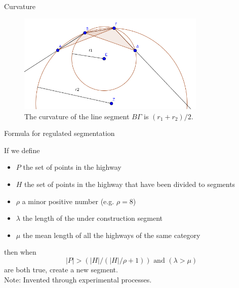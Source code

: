 \documentclass{beamer}
\begin{document}
\begin{frame}{Curvature}
  \begin{figure}[h]
    \includegraphics[width=0.8\textwidth]{line_segment_curvature}
    \caption{The curvature of the line segment $B\Gamma$ is $(r_1+r_2)/2$.}
  \end{figure}
\end{frame}

\begin{frame}{Formula for regulated segmentation}
  \begin{block}{}
    If we define
    \begin{itemize}
      \item $P$ the set of points in the highway
      \item $H$ the set of points in the highway that have been divided to segments
      \item $\rho$ a minor positive number (e.g. $\rho = 8$)
      \item $\lambda$ the length of the under construction segment
      \item $\mu$ the mean length of all the highways of the same category
    \end{itemize}
    then when
    \[
      |P| > (|H|/(|H|/\rho + 1)) \textrm{ and } (\lambda > \mu)
    \]
    are both true, create a new segment.\\
    Note: Invented through experimental processes.
  \end{block}
\end{frame}
\end{document}

